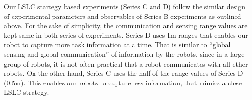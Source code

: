 \documentclass[journal]{IEEEtran}
\begin{document}

Our LSLC startegy based experiments (Series C and D) follow the similar design of experimental parameters and observables of Series B experiments as outlined above. For the sake of simplicity, the communication and sensing range values are kept same in both series of experiments. Series D uses 1m ranges that enables our robot to capture more task information at a time. That is similar to  ``global sensing and global communication'' of information by the robots, since in a large group of robots, it is not often practical that a robot communicates with all other robots. On the other hand, Series C uses the half of the range values of Series D (0.5m). This enables our robots to capture less information, that mimics a close LSLC strategy. 
\end{document}
